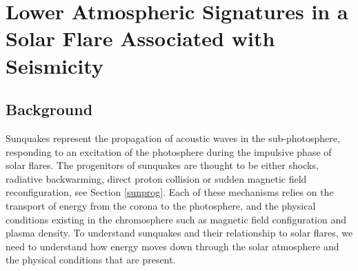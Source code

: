 \section{Lower Atmospheric Signatures in a Solar Flare Associated with Seismicity}




\subsection{Background}
Sunquakes represent the propagation of acoustic waves in the sub-photosphere, responding to an excitation of the photosphere during the impulsive phase of solar flares. The progenitors of sunquakes are thought to be either shocks, radiative backwarming, direct proton collision or sudden magnetic field reconfiguration, see Section \ref{sunprog}. Each of these mechanisms relies on the transport of energy from the corona to the photosphere, and the physical conditions existing in the chromosphere such as magnetic field configuration and plasma density. To understand sunquakes and their relationship to solar flares, we need to understand how energy moves down through the solar atmosphere and the physical conditions that are present. \\

